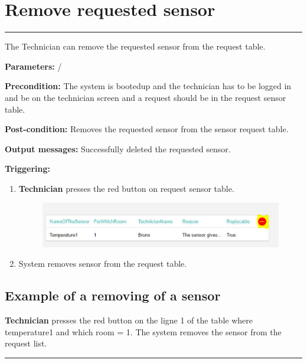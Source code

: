 \section{Remove  requested sensor}

\hrule
\hfill
\vspace{0.5cm}
\label{operation:Remove a new sensor}

The Technician can remove the requested sensor from the request table.
\begin{description}
\item \textbf{Parameters:} /
\item \textbf{Precondition:} The system is bootedup and the technician has to be
logged in and be on the technician screen and a request should be in the
request sensor table.
\item \textbf{Post-condition:} Removes the requested sensor from the sensor
request table.
\item \textbf{Output messages:} Successfully deleted the requested sensor.
\item \textbf{Triggering:}
\begin{enumerate}
\item \textbf{Technician} presses the red button on request sensor table.
\begin{figure}[H]
\includegraphics[width=1\textwidth]{images/RemoveSensorFromSensorRequestListTechnician.eps}
\end{figure}
\item System removes sensor from the request table.
\end{enumerate}
\end{description}

\subsection{Example of a removing of a sensor}
\textbf{Technician} presses the red button on the ligne 1 of the table where
temperature1 and which room = 1. The system removes the sensor from the request
list.

\hfill
\vspace{0.5cm}
\hrule



\break



